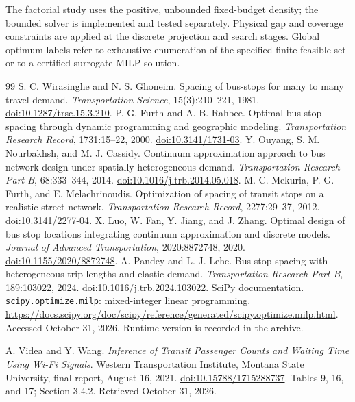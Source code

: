 \documentclass[11pt]{article}
\theoremstyle{remark}\newtheorem{remark}[theorem]{Remark}
\begin{document}
The factorial study uses the positive, unbounded fixed-budget density; the bounded solver is implemented and tested separately. Physical gap and coverage constraints are applied at the discrete projection and search stages. Global optimum labels refer to exhaustive enumeration of the specified finite feasible set or to a certified surrogate MILP solution.

\begin{thebibliography}{99}\small
{} S. C. Wirasinghe and N. S. Ghoneim. Spacing of bus-stops for many to many travel demand. \emph{Transportation Science}, 15(3):210--221, 1981. \href{https://doi.org/10.1287/trsc.15.3.210}{doi:10.1287/trsc.15.3.210}.
 P. G. Furth and A. B. Rahbee. Optimal bus stop spacing through dynamic programming and geographic modeling. \emph{Transportation Research Record}, 1731:15--22, 2000. \href{https://doi.org/10.3141/1731-03}{doi:10.3141/1731-03}.
 Y. Ouyang, S. M. Nourbakhsh, and M. J. Cassidy. Continuum approximation approach to bus network design under spatially heterogeneous demand. \emph{Transportation Research Part B}, 68:333--344, 2014. \href{https://doi.org/10.1016/j.trb.2014.05.018}{doi:10.1016/j.trb.2014.05.018}.
 M. C. Mekuria, P. G. Furth, and E. Melachrinoudis. Optimization of spacing of transit stops on a realistic street network. \emph{Transportation Research Record}, 2277:29--37, 2012. \href{https://doi.org/10.3141/2277-04}{doi:10.3141/2277-04}.
 X. Luo, W. Fan, Y. Jiang, and J. Zhang. Optimal design of bus stop locations integrating continuum approximation and discrete models. \emph{Journal of Advanced Transportation}, 2020:8872748, 2020. \href{https://doi.org/10.1155/2020/8872748}{doi:10.1155/2020/8872748}.
 A. Pandey and L. J. Lehe. Bus stop spacing with heterogeneous trip lengths and elastic demand. \emph{Transportation Research Part B}, 189:103022, 2024. \href{https://doi.org/10.1016/j.trb.2024.103022}{doi:10.1016/j.trb.2024.103022}.
 SciPy documentation. \texttt{scipy.optimize.milp}: mixed-integer linear programming. \url{https://docs.scipy.org/doc/scipy/reference/generated/scipy.optimize.milp.html}. Accessed October 31, 2026. Runtime version is recorded in the archive.

 A. Videa and Y. Wang. \emph{Inference of Transit Passenger Counts and Waiting Time Using Wi-Fi Signals}. Western Transportation Institute, Montana State University, final report, August 16, 2021. \href{https://doi.org/10.15788/1715288737}{doi:10.15788/1715288737}. Tables 9, 16, and 17; Section 3.4.2. Retrieved October 31, 2026.
\end{thebibliography}
\end{document}
